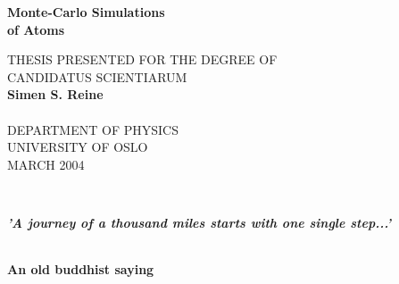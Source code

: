 \documentclass[twoside,a4paper,12pt]{report}
\begin{document}
%

\begin{titlepage}
\begin{center}
  \phantom{A}
  \vspace{0.2cm}
  {\Huge \bf Monte-Carlo Simulations \\\vspace{5pt}
  of Atoms} \\
  \vspace{2cm}

  {\large THESIS PRESENTED FOR THE DEGREE OF \\ CANDIDATUS SCIENTIARUM \\}
  \vspace{2cm}
  {\bf  Simen S. Reine} \\
  \vspace{2cm}
   \\
  \vspace{2cm}
  {\large  DEPARTMENT OF PHYSICS \\ UNIVERSITY OF OSLO \\\vspace{3pt} MARCH 2004}
\end{center}
\end{titlepage}

\clearpage
\thispagestyle{empty}
\cleardoublepage
\pagestyle{headings}

\begin{center}
\begin{equation*}
\begin{array}{c}
\phantom{A} \\[6cm]
\phantom{A}
\end{array}
\end{equation*}
{\bf \large \emph{'A journey of a thousand miles starts with one
    single step...'}}
\begin{equation*}
\begin{array}{c}
\phantom{A} \\[3cm]
\phantom{A}
\end{array}
\end{equation*}
{\bf \large \phantom{AAAAAAAAAAAAAAAAAAAAAA} An old buddhist saying}
\thispagestyle{empty}
\clearpage
\thispagestyle{empty}
\cleardoublepage
\pagestyle{headings}

\end{center}
\clearpage

\end{document}
